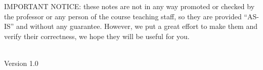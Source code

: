 \documentclass[11pt]{report}
\makeatletter
\let\thedate\@date
\makeatother
\begin{document}
\begin{titlepage}
	\begin{minipage}{\textwidth}
		IMPORTANT NOTICE: these notes are not in any way promoted or checked by the professor or any
		person of the course teaching staff, so they are provided “AS-IS” and without any guarantee. However,
		we put a great effort to make them and verify their correctness, we hope they will be useful for you.
	\end{minipage}\\ [0.5 cm]

	{\large Version 1.0 \\ \thedate}\\

	
\end{titlepage}




\tableofcontents
\pagebreak

\def\slides{slides/01_intro.pdf}


\def\slides{slides/02_crypto_p1.pdf}














\appendix


\end{document}

